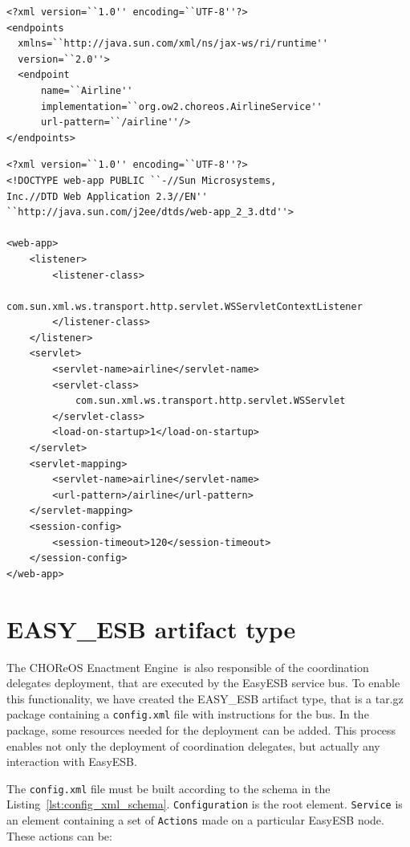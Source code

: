 \documentclass[a4paper, 10pt]{article}
\newcommand{\ee}{CHOReOS Enactment Engine}
\begin{document}
{\footnotesize
\begin{lstlisting}[caption=Example of \texttt{sun-jaxws.xml} file, label=lst:sun_jaxws_xml]
<?xml version=``1.0'' encoding=``UTF-8''?>
<endpoints
  xmlns=``http://java.sun.com/xml/ns/jax-ws/ri/runtime''
  version=``2.0''>
  <endpoint
      name=``Airline''
      implementation=``org.ow2.choreos.AirlineService''
      url-pattern=``/airline''/>
</endpoints>
\end{lstlisting}
}

{\footnotesize
\begin{lstlisting}[caption=Example of \texttt{web.xml} file, label=lst:web_xml]
<?xml version=``1.0'' encoding=``UTF-8''?>
<!DOCTYPE web-app PUBLIC ``-//Sun Microsystems, 
Inc.//DTD Web Application 2.3//EN''
``http://java.sun.com/j2ee/dtds/web-app_2_3.dtd''>
 
<web-app>
    <listener>
        <listener-class>
                com.sun.xml.ws.transport.http.servlet.WSServletContextListener
        </listener-class>
    </listener>
    <servlet>
        <servlet-name>airline</servlet-name>
        <servlet-class>
        	com.sun.xml.ws.transport.http.servlet.WSServlet
        </servlet-class>
        <load-on-startup>1</load-on-startup>
    </servlet>
    <servlet-mapping>
        <servlet-name>airline</servlet-name>
        <url-pattern>/airline</url-pattern>
    </servlet-mapping>
    <session-config>
        <session-timeout>120</session-timeout>
    </session-config>
</web-app>
\end{lstlisting}
}

\section{EASY\_ESB artifact type}

The \ee\ is also responsible of the coordination delegates deployment, that are executed by the EasyESB service bus. To enable this functionality, we have created the EASY\_ESB artifact type, that is a tar.gz package containing a \texttt{config.xml} file with instructions for the bus. In the package, some resources needed for the deployment can be added. This process enables not only the deployment of coordination delegates, but actually any interaction with EasyESB.

The \texttt{config.xml} file must be built according to the schema in the Listing~\ref{lst:config_xml_schema}. \texttt{Configuration} is the root element. \texttt{Service} is an element containing a set of \texttt{Actions} made on a particular EasyESB node. These actions can be:
\end{document}
